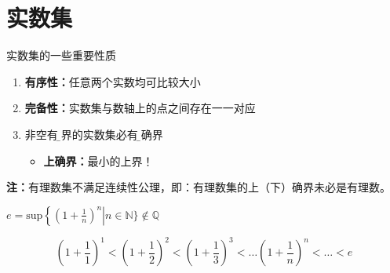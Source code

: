 \section{实数集}

\begin{frame}{实数集的一些重要性质}
	\linespread{1.5}
	\begin{enumerate}\pause 
	  \item {\bf 有序性：\pause }任意两个实数均可比较大小\pause 
	  \item {\bf 完备性：\pause }实数集与数轴上的点之间存在一一对应\pause 
	  \item {}非空有{\b 上界}的实数集必有{\b 上确界}\pause 
	  \begin{itemize}
	    \item {\bf 上确界：}最小的上界！\pause 
	  \end{itemize}
	\end{enumerate}
	{\bf 注：}有理数集不满足连续性公理\pause ，即：有理数集的上（下）确界未必是有理数。
\end{frame}

\begin{frame}{$e=\mathrm{sup}\left\{\left(1+\frac
1n\right)^n\right|n\in\mathbb{N}\}\notin\mathbb{Q}$}
	\linespread{1.2}\pause
	\begin{center}
	\end{center}\pause
	{\small
	$$\left(1+\frac11\right)^1<\left(1+\frac12\right)^2<\left(1+\frac13\right)^3<\ldots
	\left(1+\frac1n\right)^n<\ldots<e$$}
\end{frame}

